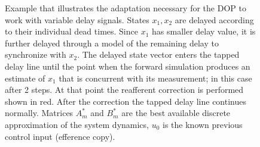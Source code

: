 \begin{figure}[h!]
    \centering

    \caption{Example that illustrates the adaptation necessary for the DOP to work with variable delay signals. States \ensuremath{x_1, x_2} are delayed according to their individual dead times. Since \ensuremath{x_1} has smaller delay value, it is further delayed through a model of the remaining delay to synchronize with \ensuremath{x_2}. The delayed state vector enters the tapped delay line until the point when the forward simulation produces an estimate of \ensuremath{x_1} that is concurrent with its measurement; in this case after 2 steps. At that point the reafferent correction is performed shown  in red. After the correction the tapped delay line continues normally. Matrices \ensuremath{A^*_m} and \ensuremath{B^*_m} are the best available discrete approximation of the system dynamics, \ensuremath{u_0} is the known previous control input (efference copy).}
    \label{fig:VDROP_line}
\end{figure}
